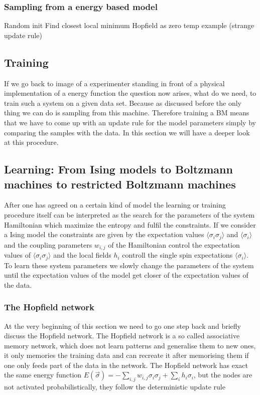 \documentclass[nofootinbib, superscriptaddress, prl]{revtex4}
\begin{document}
\subsubsection{Sampling from a energy based model}

Random init
Find closest local minimum
Hopfield as zero temp example (strange update rule)

\subsection{Training}

If we go back to image of a experimenter standing in front of a physical implementation of a energy function the question now arises, what do we need, to train such a system on a given data set. Because as discussed before the only thing we can do is sampling from this machine. Therefore training a BM means that we have to come up with an update rule for the model parameters simply by comparing the samples with the data. In this section we will have a deeper look at this procedure. 

\subsection{Learning: From Ising models to Boltzmann machines to restricted Boltzmann machines}

After one has agreed on a certain kind of model the learning or training procedure itself can be interpreted as the search for the parameters of the system Hamiltonian which maximize the entropy and fulfil the constraints. If we consider a Ising model the constraints are given by the expectation values $\langle \sigma_i \sigma_j \rangle $
 and $\langle \sigma_i \rangle$ and the coupling parameters $w_{i,j}$ of the Hamiltonian control the expectation values of $\langle \sigma_i \sigma_j \rangle $ and the local fields $h_i$ controll the single spin expectations $\langle \sigma_i \rangle$.
To learn these system parameters we slowly change the parameters of the system until the expectation values of the model get closer of the expectation values of the data. 

\subsubsection{The Hopfield network}

At the very beginning of this section we need to go one step back and briefly discuss the Hopfield network. The Hopfield network is a so called associative memory network, which does not learn patterns and generalise them to new ones, it only memories the training data and can recreate it after memorising them if one only feeds part of the data in the network. The Hopfield network has exact the same energy function $E(\vec {\sigma}) = -\sum_{i,j} w_{i,j} \sigma_i \sigma_j + \sum_i h_i \sigma_i$, but the nodes are not activated probabilistically, they follow the deterministic update rule
\end{document}
